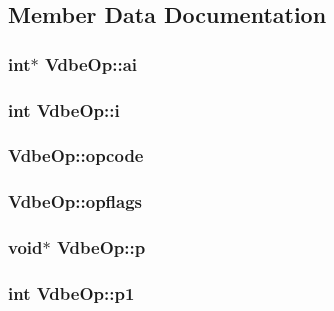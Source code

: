\subsection{Member Data Documentation}
\hypertarget{struct_vdbe_op_ad04f10290bdb4d5f6378df4b5b4022d5}{
\subsubsection[{ai}]{\setlength{\rightskip}{0pt plus 5cm}int$\ast$ Vdbe\-Op\-::ai}}\label{struct_vdbe_op_ad04f10290bdb4d5f6378df4b5b4022d5}
\hypertarget{struct_vdbe_op_a69efeafb8cb87ea2a6feed61e877869a}{
\subsubsection[{i}]{\setlength{\rightskip}{0pt plus 5cm}int Vdbe\-Op\-::i}}\label{struct_vdbe_op_a69efeafb8cb87ea2a6feed61e877869a}
\hypertarget{struct_vdbe_op_ae12a8e7a8f5f7ba39fa379c9ad287837}{
\subsubsection[{opcode}]{ Vdbe\-Op\-::opcode}}\label{struct_vdbe_op_ae12a8e7a8f5f7ba39fa379c9ad287837}
\hypertarget{struct_vdbe_op_a169a7bbe99a90c26ee01833723750b1d}{
\subsubsection[{opflags}]{ Vdbe\-Op\-::opflags}}\label{struct_vdbe_op_a169a7bbe99a90c26ee01833723750b1d}
\hypertarget{struct_vdbe_op_a27a7eaab2fd6a79638f134576847f446}{
\subsubsection[{p}]{\setlength{\rightskip}{0pt plus 5cm}void$\ast$ Vdbe\-Op\-::p}}\label{struct_vdbe_op_a27a7eaab2fd6a79638f134576847f446}
\hypertarget{struct_vdbe_op_a17c8326a1e3ac5612d4aaaa88f383b3b}{
\subsubsection[{p1}]{\setlength{\rightskip}{0pt plus 5cm}int Vdbe\-Op\-::p1}}\label{struct_vdbe_op_a17c8326a1e3ac5612d4aaaa88f383b3b}
